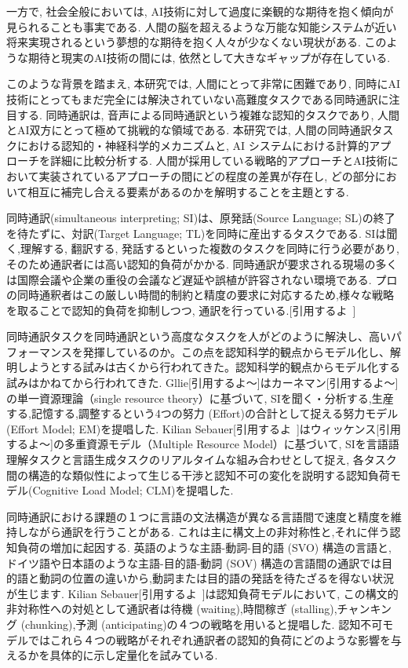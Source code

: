一方で, 社会全般においては, AI技術に対して過度に楽観的な期待を抱く傾向が見られることも事実である.
人間の脳を超えるような万能な知能システムが近い将来実現されるという夢想的な期待を抱く人々が少なくない現状がある.
このような期待と現実のAI技術の間には, 依然として大きなギャップが存在している.

このような背景を踏まえ, 本研究では, 人間にとって非常に困難であり, 同時にAI技術にとってもまだ完全には解決されていない高難度タスクである同時通訳に注目する.
同時通訳は, 音声による同時通訳という複雑な認知的タスクであり, 人間とAI双方にとって極めて挑戦的な領域である.
本研究では, 人間の同時通訳タスクにおける認知的・神経科学的メカニズムと, AI システムにおける計算的アプローチを詳細に比較分析する.
人間が採用している戦略的アプローチとAI技術において実装されているアプローチの間にどの程度の差異が存在し, どの部分において相互に補完し合える要素があるのかを解明することを主題とする.

同時通訳(simultaneous interpreting; SI)は、原発話(Source Language; SL)の終了を待たずに、対訳(Target Language; TL)を同時に産出するタスクである.
SIは聞く,理解する, 翻訳する, 発話するといった複数のタスクを同時に行う必要があり, そのため通訳者には高い認知的負荷がかかる. 
同時通訳が要求される現場の多くは国際会議や企業の重役の会議など遅延や誤植が許容されない環境である.
プロの同時通釈者はこの厳しい時間的制約と精度の要求に対応するため,様々な戦略を取ることで認知的負荷を抑制しつつ, 通訳を行っている.[引用するよ~]

同時通訳タスクを同時通訳という高度なタスクを人がどのように解決し、高いパフォーマンスを発揮しているのか。この点を認知科学的観点からモデル化し、解明しようとする試みは古くから行われてきた。認知科学的観点からモデル化する試みはかねてから行われてきた.
Gllie[引用するよ〜]はカーネマン[引用するよ〜]の単一資源理論（single resource theory）に基づいて, SIを聞く・分析する,生産する,記憶する,調整するという4つの努力 (Effort)の合計として捉える努力モデル(Effort Model; EM)を提唱した.
Kilian Sebauer[引用するよ~]はウィッケンス[引用するよ〜]の多重資源モデル（Multiple Resource Model）に基づいて, SIを言語語理解タスクと言語生成タスクのリアルタイムな組み合わせとして捉え, 各タスク間の構造的な類似性によって生じる干渉と認知不可の変化を説明する認知負荷モデル(Cognitive Load Model; CLM)を提唱した.

同時通訳における課題の１つに言語の文法構造が異なる言語間で速度と精度を維持しながら通訳を行うことがある.
これは主に構文上の非対称性と,それに伴う認知負荷の増加に起因する.
英語のような主語-動詞-目的語 (SVO) 構造の言語と, ドイツ語や日本語のような主語-目的語-動詞 (SOV) 構造の言語間の通訳では目的語と動詞の位置の違いから,動詞または目的語の発話を待たざるを得ない状況が生じます.
Kilian Sebauer[引用するよ~]は認知負荷モデルにおいて, この構文的非対称性への対処として通訳者は待機 (waiting),時間稼ぎ (stalling),チャンキング (chunking),予測 (anticipating)の４つの戦略を用いると提唱した.
認知不可モデルではこれら４つの戦略がそれぞれ通訳者の認知的負荷にどのような影響を与えるかを具体的に示し定量化を試みている.

